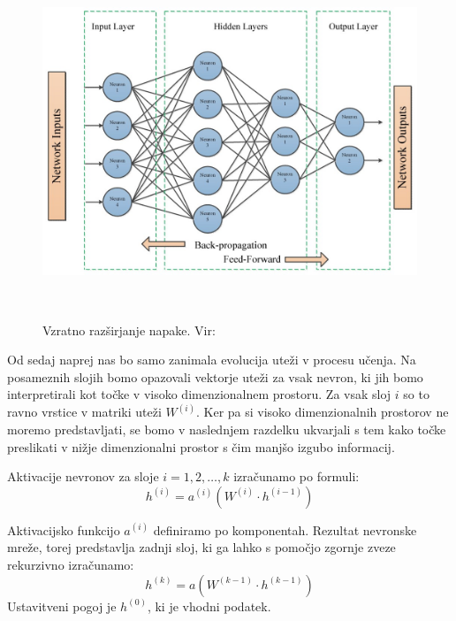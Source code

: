 \begin{figure}[H]
  \centering
  \includegraphics[width=0.7\linewidth]{resources/backpropagation.jpeg}
  \caption{Vzratno razširjanje napake. Vir:~\cite{electronics10212689}}~\label{fig:backprop}
\end{figure}

Od sedaj naprej nas bo samo zanimala evolucija uteži v procesu učenja. Na posameznih slojih bomo opazovali vektorje uteži za vsak nevron, ki jih bomo interpretirali kot točke v visoko dimenzionalnem prostoru. Za vsak sloj $i$ so to  ravno vrstice v matriki uteži $W^{(i)}$. Ker pa si visoko dimenzionalnih prostorov ne moremo predstavljati, se bomo v naslednjem razdelku ukvarjali s tem kako točke preslikati v nižje dimenzionalni prostor s čim manjšo izgubo informacij.

Aktivacije nevronov za sloje $i = 1, 2, \ldots, k$ izračunamo po formuli:
\begin{equation}
  h^{(i)} = a^{(i)}(W^{(i)} \cdot h^{(i - 1)})
\end{equation}

Aktivacijsko funkcijo $a^{(i)}$ definiramo po komponentah. Rezultat nevronske mreže, torej predstavlja zadnji sloj, ki ga lahko s pomočjo zgornje zveze rekurzivno izračunamo:
\begin{equation}
  h^{(k)} = a(W^{(k - 1)} \cdot h^{(k - 1)})
  \label{eq:eq1}
\end{equation}
Ustavitveni pogoj je $h^{(0)}$, ki je vhodni podatek.
